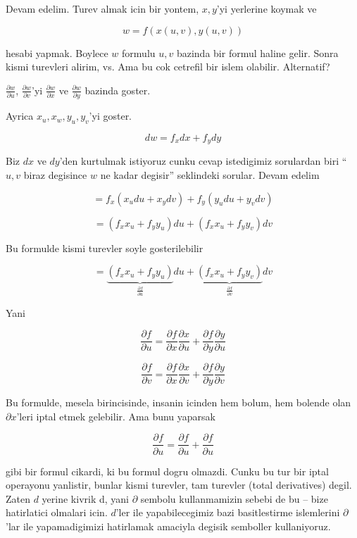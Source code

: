 \documentclass[12pt,fleqn]{article}
\begin{document}
Devam edelim. Turev almak icin bir yontem, $x,y$'yi yerlerine koymak ve

\[ w = f(x(u,v),y(u,v)) \]

hesabi yapmak. Boylece $w$ formulu $u,v$ bazinda bir formul haline
gelir. Sonra kismi turevleri alirim, vs. Ama bu cok cetrefil bir islem
olabilir. Alternatif?

$\frac{\partial w}{\partial u}$, $\frac{\partial w}{\partial v}$'yi $\frac{\partial w}{\partial x}$ ve $\frac{\partial w}{\partial y}$ bazinda goster. 

Ayrica $x_u, x_w, y_u, y_v$'yi goster. 

\[ dw =  f_xdx + f_y dy\]

Biz $dx$ ve $dy$'den kurtulmak istiyoruz cunku cevap istedigimiz sorulardan
biri ``$u,v$ biraz degisince $w$ ne kadar degisir'' seklindeki
sorular. Devam edelim

\[ = f_x (x_u du + x_y dv) + f_y (y_u du + y_v dv ) \]

\[ = (f_x x_u + f_yy_u )du  + (f_xx_u + f_yy_v)dv\]

Bu formulde kismi turevler soyle gosterilebilir

\[ = \underbrace{(f_x x_u + f_yy_u )}_{\frac{\partial f}{\partial u}}du  + 
\underbrace{(f_xx_u + f_yy_v)}_{\frac{\partial f}{\partial v}}dv
\]

Yani

\[ \frac{\partial f}{\partial u} = 
\frac{\partial f}{\partial x}\frac{\partial x}{\partial u} +
\frac{\partial f}{\partial y}\frac{\partial y}{\partial u} 
\]

\[ \frac{\partial f}{\partial v} = 
\frac{\partial f}{\partial x}\frac{\partial x}{\partial v} +
\frac{\partial f}{\partial y}\frac{\partial y}{\partial v} 
\]

Bu formulde, mesela birincisinde, insanin icinden hem bolum, hem bolende
olan $\partial x$'leri iptal etmek gelebilir. Ama bunu yaparsak

\[ \frac{\partial f}{\partial u} = 
\frac{\partial f}{\partial u} + \frac{\partial f}{\partial u} 
\]

gibi bir formul cikardi, ki bu formul dogru olmazdi. Cunku bu tur bir iptal
operayonu yanlistir, bunlar kismi turevler, tam turevler (total
derivatives) degil. Zaten $d$ yerine kivrik d, yani $\partial$ sembolu
kullanmamizin sebebi de bu -- bize hatirlatici olmalari icin. $d$'ler ile
yapabilecegimiz bazi basitlestirme islemlerini $\partial$'lar ile
yapamadigimizi hatirlamak amaciyla degisik semboller kullaniyoruz. 
\end{document}
